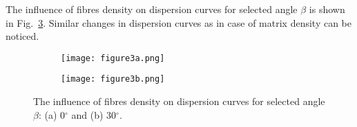 \documentclass[preprint,12pt]{elsarticle}
\providecommand{\DIFaddbeginFL}{} %
\providecommand{\DIFaddendFL}{} %
\providecommand{\DIFdelbeginFL}{} %
\providecommand{\DIFdelendFL}{} %
\begin{document}
The influence of fibres density on dispersion curves for selected angle $\beta$ is shown in Fig.~\ref{fig:rhof}. Similar changes in dispersion curves as in case of matrix density can be noticed.

\begin{figure} [h!]
	\centering
	\begin{subfigure}[b]{0.49\textwidth}
		\centering
		\DIFdelbeginFL %
\DIFdelendFL \DIFaddbeginFL \texttt{[image: figure3a.png]}
		\DIFaddendFL \caption{}
		\label{fig:rhof0}
	\end{subfigure}
	\hfill
	\begin{subfigure}[b]{0.49\textwidth}
		\centering
		\DIFdelbeginFL %
\DIFdelendFL \DIFaddbeginFL \texttt{[image: figure3b.png]}
		\DIFaddendFL \caption{}
		\label{fig:rhof30}
	\end{subfigure}
	\caption{The influence of fibres density on dispersion curves for selected angle $\beta$: (a) 0$^{\circ}$ and (b) 30$^{\circ}$.} 
	\label{fig:rhof}
\end{figure}
\end{document}
